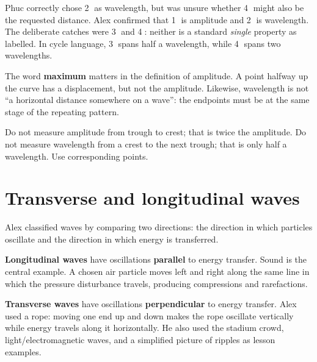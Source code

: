 \documentclass[11pt,a4paper]{article}
\newcommand{\trap}[1]{\begin{mistakebox}#1\end{mistakebox}}
\begin{document}
Phuc correctly chose \textcircled{2} as wavelength, but was unsure whether \textcircled{4} might also be the requested distance. Alex confirmed that \textcircled{1} is amplitude and \textcircled{2} is wavelength. The deliberate catches were \textcircled{3} and \textcircled{4}: neither is a standard \emph{single} property as labelled. In cycle language, \textcircled{3} spans half a wavelength, while \textcircled{4} spans two wavelengths.

The word \textbf{maximum} matters in the definition of amplitude. A point halfway up the curve has a displacement, but not the amplitude. Likewise, wavelength is not ``a horizontal distance somewhere on a wave'': the endpoints must be at the same stage of the repeating pattern.

\trap{Do not measure amplitude from trough to crest; that is twice the amplitude. Do not measure wavelength from a crest to the next trough; that is only half a wavelength. Use corresponding points.}

\section{Transverse and longitudinal waves}
Alex classified waves by comparing two directions: the direction in which particles oscillate and the direction in which energy is transferred.

\textbf{Longitudinal waves} have oscillations \textbf{parallel} to energy transfer. Sound is the central example. A chosen air particle moves left and right along the same line in which the pressure disturbance travels, producing compressions and rarefactions.

\textbf{Transverse waves} have oscillations \textbf{perpendicular} to energy transfer. Alex used a rope: moving one end up and down makes the rope oscillate vertically while energy travels along it horizontally. He also used the stadium crowd, light/electromagnetic waves, and a simplified picture of ripples as lesson examples.
\end{document}
